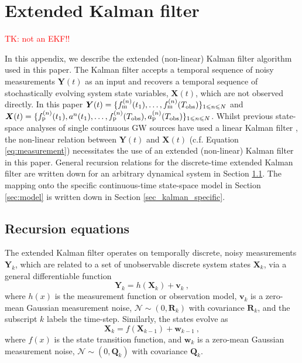 \documentclass[fleqn,usenatbib,useAMS]{mnras}
\begin{document}
\section{Extended Kalman filter} \label{sec:kalman}



\textcolor{red}{TK: not an EKF!!}


In this appendix, we describe the extended (non-linear) Kalman filter algorithm used in this paper. The Kalman filter accepts a temporal sequence of noisy measurements $\boldsymbol{Y}(t)$ as an input and recovers a temporal sequence of stochastically evolving system state variables, $\boldsymbol{X}(t)$, which are not observed directly. In this paper ${\boldsymbol{Y}}(t) = \{ f^{(n)}_{\rm m}(t_1), \dots, f^{(n)}_{\rm m}(T_{\rm obs})  \}_{1 \leq n \leq N}$ and ${\boldsymbol{X}}(t) = \{ f^{(n)}_{\rm p}(t_1), a^{n}(t_1), \dots, f^{(n)}_{\rm p}(T_{\rm obs}),a^{(n)}_{\rm p}(T_{\rm obs})   \}_{1 \leq n \leq N}$. Whilst previous state-space analyses of single continuous GW sources have used a linear Kalman filter \citep{KimpsonPTA1,KimpsonPTA2}, the non-linear relation between ${\boldsymbol{Y}}(t)$ and ${\boldsymbol{X}}(t)$ (c.f. Equation \eqref{eq:measurement}) necessitates the use of an extended (non-linear) Kalman filter \citep{zarchan2000fundamentals} in this paper. General recursion relations for the discrete-time extended Kalman filter are written down for an arbitrary dynamical system in Section \ref{sec_kalman_general}. The mapping onto the specific continuous-time state-space model in Section \ref{sec:model} is written down in Section \ref{sec_kalman_specific}.


\subsection{Recursion equations}\label{sec_kalman_general}
The extended Kalman filter operates on temporally discrete, noisy measurements $\boldsymbol{Y}_k$, which are related to a set of unobservable discrete system states $\boldsymbol{X}_k$, via a general differentiable function
\begin{equation}
	\boldsymbol{Y}_k = h \left(\boldsymbol{X}_k\right) + \boldsymbol{v}_k \ ,\label{eq:kalman1}
\end{equation}
where $h(x)$ is the measurement function or observation model, $\boldsymbol{v}_k$ is a zero-mean Gaussian measurement noise, $\mathcal{N} \sim (0,\boldsymbol{R}_k)$ with covariance $\boldsymbol{R}_k$, and the subscript $k$ labels the time-step. Similarly, the states evolve as
\begin{equation}
	\boldsymbol{X}_k = f \left(\boldsymbol{X}_{k-1}\right) + \boldsymbol{w}_{k-1} \ ,\label{eq:kalman1}
\end{equation}
where $f(x)$ is the state transition function, and $\boldsymbol{w}_k$ is a zero-mean Gaussian measurement noise, $\mathcal{N} \sim (0,\boldsymbol{Q}_k)$ with covariance $\boldsymbol{Q}_k$. \newline 
\end{document}
